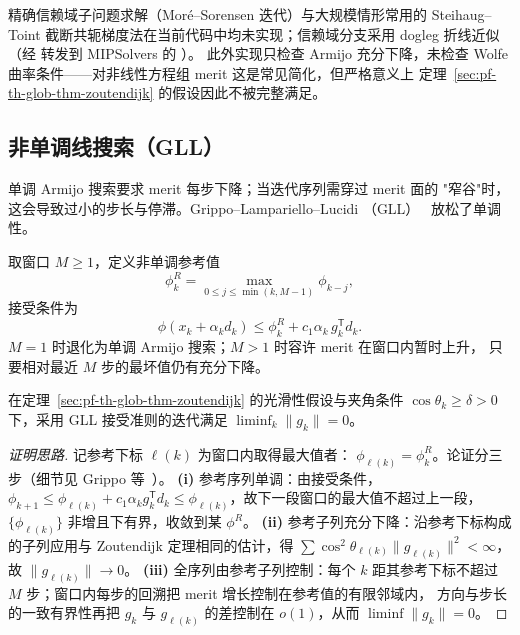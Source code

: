 \begin{gapnote}
精确信赖域子问题求解（Moré--Sorensen 迭代）与大规模情形常用的
Steihaug--Toint 截断共轭梯度法在当前代码中均未实现；信赖域分支采用
dogleg 折线近似（经 
转发到 MIPSolvers 的 ）。
此外实现只检查 Armijo 充分下降，未检查 Wolfe 曲率条件——对非线性方程组
merit 这是常见简化，但严格意义上
定理~\ref{sec:pf-th-glob-thm-zoutendijk} 的假设因此不被完整满足。
\end{gapnote}

\subsection{非单调线搜索（GLL）}\label{sec:pf-th-glob-gll}

单调 Armijo 搜索要求 merit 每步下降；当迭代序列需穿过 merit 面的
"窄谷"时，这会导致过小的步长与停滞。Grippo--Lampariello--Lucidi
（GLL）~\cite{pfglob-gll} 放松了单调性。

\begin{definition}\label{sec:pf-th-glob-def-gll}
取窗口 $M\ge1$，定义非单调参考值
\begin{equation}
\phi_k^{R}=\max_{0\le j\le\min(k,M-1)}\phi_{k-j},
\end{equation}
接受条件为
\begin{equation}
\phi(x_k+\alpha_k d_k)\le\phi_k^{R}
+c_1\alpha_k\,g_k^{\mathsf T}d_k .
\end{equation}
$M=1$ 时退化为单调 Armijo 搜索；$M>1$ 时容许 merit 在窗口内暂时上升，
只要相对最近 $M$ 步的最坏值仍有充分下降。
\end{definition}

\begin{theorem}\label{sec:pf-th-glob-thm-gll}
在定理~\ref{sec:pf-th-glob-thm-zoutendijk} 的光滑性假设与夹角条件
$\cos\theta_k\ge\delta>0$ 下，采用 GLL 接受准则的迭代满足
$\liminf_k\lVert g_k\rVert=0$。
\end{theorem}

\begin{proof}[证明思路]
记参考下标 $\ell(k)$ 为窗口内取得最大值者：
$\phi_{\ell(k)}=\phi_k^{R}$。论证分三步（细节见
Grippo 等~\cite{pfglob-gll}）。
\textbf{(i)} 参考序列单调：由接受条件，
$\phi_{k+1}\le\phi_{\ell(k)}+c_1\alpha_k g_k^{\mathsf T}d_k
\le\phi_{\ell(k)}$，故下一段窗口的最大值不超过上一段，
$\{\phi_{\ell(k)}\}$ 非增且下有界，收敛到某 $\phi^R$。
\textbf{(ii)} 参考子列充分下降：沿参考下标构成的子列应用与
Zoutendijk 定理相同的估计，得
$\sum\cos^2\theta_{\ell(k)}\lVert g_{\ell(k)}\rVert^2<\infty$，
故 $\lVert g_{\ell(k)}\rVert\to0$。
\textbf{(iii)} 全序列由参考子列控制：每个 $k$ 距其参考下标不超过
$M$ 步；窗口内每步的回溯把 merit 增长控制在参考值的有限邻域内，
方向与步长的一致有界性再把 $g_k$ 与 $g_{\ell(k)}$ 的差控制在
$o(1)$，从而 $\liminf\lVert g_k\rVert=0$。
\end{proof}

